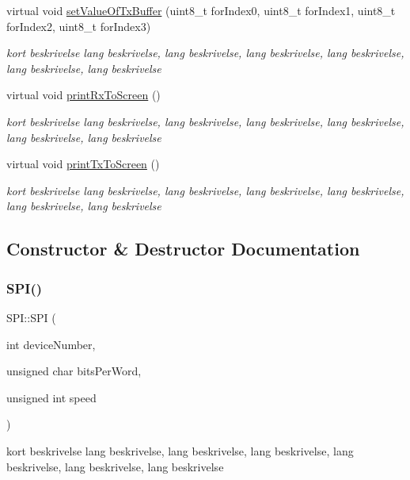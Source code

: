 \begin{DoxyCompactItemize}
virtual void \hyperlink{classSPI_ad581e7b40a17f41f8d6db8dec97c9c4b}{set\+Value\+Of\+Tx\+Buffer} (uint8\+\_\+t for\+Index0, uint8\+\_\+t for\+Index1, uint8\+\_\+t for\+Index2, uint8\+\_\+t for\+Index3)
\begin{DoxyCompactList}\small\item\em kort beskrivelse lang beskrivelse, lang beskrivelse, lang beskrivelse, lang beskrivelse, lang beskrivelse, lang beskrivelse \end{DoxyCompactList}\item 
virtual void \hyperlink{classSPI_a33d7fcfab7e5962dd1392aecfd58eaca}{print\+Rx\+To\+Screen} ()
\begin{DoxyCompactList}\small\item\em kort beskrivelse lang beskrivelse, lang beskrivelse, lang beskrivelse, lang beskrivelse, lang beskrivelse, lang beskrivelse \end{DoxyCompactList}\item 
virtual void \hyperlink{classSPI_a54c4ecb02366f1e31d2e6f4aa6db8f7d}{print\+Tx\+To\+Screen} ()
\begin{DoxyCompactList}\small\item\em kort beskrivelse lang beskrivelse, lang beskrivelse, lang beskrivelse, lang beskrivelse, lang beskrivelse, lang beskrivelse \end{DoxyCompactList}\end{DoxyCompactItemize}


\subsection{Constructor \& Destructor Documentation}
\mbox{\label{classSPI_aa4928d013558671e0622e7320414ab77}} 
\subsubsection{\texorpdfstring{S\+P\+I()}{SPI()}}
{\footnotesize\ttfamily S\+P\+I\+::\+S\+PI (\begin{DoxyParamCaption}\item[{int}]{device\+Number,  }\item[{unsigned char}]{bits\+Per\+Word,  }\item[{unsigned int}]{speed }\end{DoxyParamCaption})}



kort beskrivelse lang beskrivelse, lang beskrivelse, lang beskrivelse, lang beskrivelse, lang beskrivelse, lang beskrivelse 


